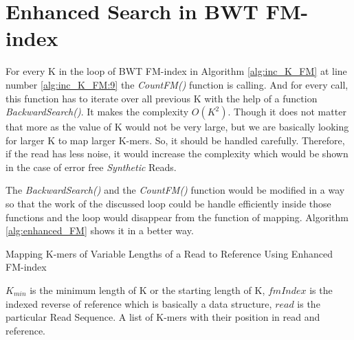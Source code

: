 \documentclass{standalone}
\begin{document}
\section{Enhanced Search in BWT FM-index}
For every K in the loop of BWT FM-index \cite{fm_index} in Algorithm \ref{alg:inc_K_FM} at line number  \ref{alg:inc_K_FM:9} the \emph{CountFM()} function is calling. And for every call, this function has to iterate over all previous K with the help of a function \emph{BackwardSearch()}. It makes the complexity $O(K^2)$. Though it does not matter that more as the value of K would not be very large, but we are basically looking for larger K to map larger K-mers. So, it should be handled carefully. Therefore, if the read has less noise, it would increase the complexity which would be shown in the case of error free \emph{Synthetic} Reads.

The \emph{BackwardSearch()} and the \emph{CountFM()} function would be modified in a way so that the work of the discussed loop could be handle efficiently inside those functions and the loop would disappear from the function of mapping. Algorithm \ref{alg:enhanced_FM} shows it in a better way.

\begin{algorithm}
	\caption{Mapping K-mers of Variable Lengths of a Read to Reference Using Enhanced FM-index }
	\label{alg:enhanced_FM}
	\begin{algorithmic}[1]
		\Require $K_{min}$ is the minimum length of K or the starting length of K, $fmIndex$ is the indexed reverse of reference which is basically a data structure, $read$ is the particular Read Sequence. 
		\Ensure A list of K-mers with their position in read and reference.

		
		\EndIf
		\EndFor
		\State{}
		\EndFunction
		
	\end{algorithmic}
\end{algorithm}
\end{document}
